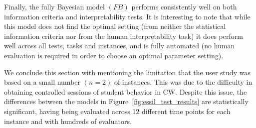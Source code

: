\documentclass[letterpaper]{article} %
\begin{document}
 
Finally, the fully Bayesian model $(FB)$ performs consistently well on both information criteria and interpretability tests. It is interesting to note that while this model does not find the optimal setting (from neither the statistical information criteria nor from the human interpretability task) it does perform well across all tests, tasks and instances, and is fully automated (no human evaluation is required in order to choose an optimal parameter setting).

We conclude this section with mentioning the limitation that the user study was based on a small number $(n=2)$  of instances. This was due to the difficulty in obtaining controlled sessions of student behavior in CW. Despite this issue, the differences between the models in Figure~\ref{fig:essil_test_results} are statistically significant, having being evaluated across 12 different time points for each instance and with hundreds of evaluators.
 
 
\end{document}
